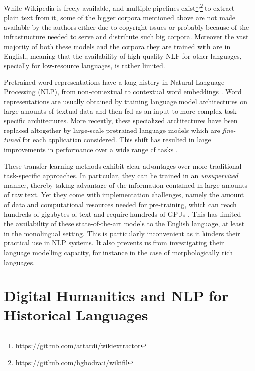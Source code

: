 While Wikipedia is freely available, and multiple pipelines exist\footnote{\url{https://github.com/attardi/wikiextractor}}\textsuperscript{,}\footnote{\url{https://github.com/hghodrati/wikifil}} to extract plain text from it, some of the bigger corpora mentioned above are not made available by the authors either due to copyright issues or probably because of the infrastructure needed to serve and distribute such big corpora. Moreover the vast majority of both these models and the corpora they are trained with are in English, meaning that the availability of high quality NLP for other languages, specially for low-resource languages, is rather limited.

Pretrained word representations have a long history in Natural Language Processing (NLP), from non-contextual \citep{brown-etal-1992-class,ando-zhang-2005-framework,mikolov-etal-2013-distributed,pennington-etal-2014-glove} to contextual word embeddings \citep{peters-etal-2018-deep,akbik-etal-2018-contextual}. Word representations are usually obtained by training language model architectures on large amounts of textual data and then fed as an input to more complex task-specific architectures. More recently, these specialized architectures have been replaced altogether by large-scale pretrained language models which are \emph{fine-tuned} for each application considered. This shift has resulted in large improvements in performance over a wide range of tasks \cite{devlin-etal-2019-bert,radford-etal-2019-language,liu-etal-2019-roberta,raffel-etal-2020-exploring}.

These transfer learning methods exhibit clear advantages over more traditional task-specific approaches. In particular, they can be trained in an \emph{unsupervized} manner, thereby taking advantage of the information contained in large amounts of raw text.
Yet they come with implementation challenges, namely the amount of data and computational resources needed for pre-training, which can reach hundreds of gigabytes of text and require hundreds of GPUs \citep{yang-etal-2019-xlnet,liu-etal-2019-roberta}. This has limited the availability of these state-of-the-art models to the English language, at least in the monolingual setting. This is particularly inconvenient as it hinders their practical use in NLP systems. It also prevents us from investigating their language modelling capacity, for instance in the case of morphologically rich languages.


\section{Digital Humanities and NLP for Historical Languages}

